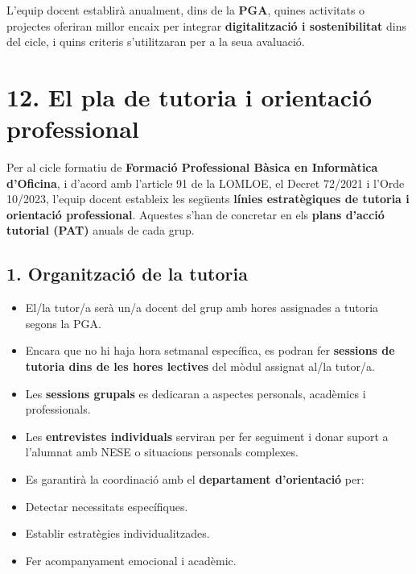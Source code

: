 \documentclass[
  paper=a4,
  ,captions=tableheading
]{scrartcl}
\providecommand{\tightlist}{%
  \setlength{\itemsep}{0pt}\setlength{\parskip}{0pt}}
\begin{document}
L'equip docent establirà anualment, dins de la \textbf{PGA}, quines
activitats o projectes oferiran millor encaix per integrar
\textbf{digitalització i sostenibilitat} dins del cicle, i quins
criteris s'utilitzaran per a la seua avaluació.

\hypertarget{el-pla-de-tutoria-i-orientaciuxf3-professional}{%
\section{12. El pla de tutoria i orientació
professional}\label{el-pla-de-tutoria-i-orientaciuxf3-professional}}

Per al cicle formatiu de \textbf{Formació Professional Bàsica en
Informàtica d'Oficina}, i d'acord amb l'article 91 de la LOMLOE, el
Decret 72/2021 i l'Orde 10/2023, l'equip docent estableix les següents
\textbf{línies estratègiques de tutoria i orientació professional}.
Aquestes s'han de concretar en els \textbf{plans d'acció tutorial (PAT)}
anuals de cada grup.

\hypertarget{organitzaciuxf3-de-la-tutoria}{%
\subsection{1. Organització de la
tutoria}\label{organitzaciuxf3-de-la-tutoria}}

\begin{itemize}
\tightlist
\item
  El/la tutor/a serà un/a docent del grup amb hores assignades a tutoria
  segons la PGA.
\item
  Encara que no hi haja hora setmanal específica, es podran fer
  \textbf{sessions de tutoria dins de les hores lectives} del mòdul
  assignat al/la tutor/a.
\item
  Les \textbf{sessions grupals} es dedicaran a aspectes personals,
  acadèmics i professionals.
\item
  Les \textbf{entrevistes individuals} serviran per fer seguiment i
  donar suport a l'alumnat amb NESE o situacions personals complexes.
\item
  Es garantirà la coordinació amb el \textbf{departament d'orientació}
  per:
\item
  Detectar necessitats específiques.
\item
  Establir estratègies individualitzades.
\item
  Fer acompanyament emocional i acadèmic.
\end{itemize}
\end{document}
